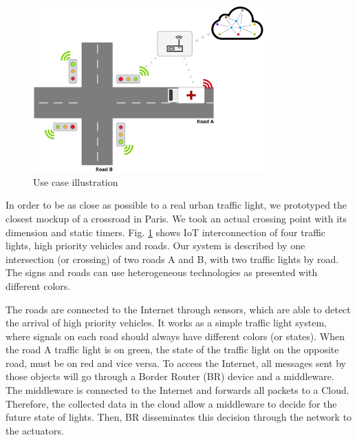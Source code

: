 \documentclass[conference]{../../setup/IEEEtran}
\begin{document}
\begin{figure}[!htb]
\centering
\includegraphics[width=3.5in]{res/CrossRoadModel_V1.eps}
\caption{Use case illustration}
\label{fig:CrossRoadModel.eps}
\end{figure}

In order to be as close as possible to a real urban traffic light, we prototyped the closest mockup of a crossroad in Paris. We took an actual crossing point with its dimension and static timers. Fig. \ref{fig:CrossRoadModel.eps} shows IoT interconnection of four traffic lights, high priority vehicles and roads.  Our system is described by one intersection (or crossing) of two roads A and B, with two traffic lights by road. The signs and roads can use heterogeneous technologies as presented with different colors. 

The roads are connected to the Internet through sensors, which are able to detect the arrival of high priority vehicles. It works as a simple traffic light system, where signals on each road should always have different colors (or states). When the road A traffic light is on green, the state of the traffic light on the opposite road, must be on red and vice versa. To access the Internet, all messages sent by those objects will go through a Border Router (BR) device and a middleware. The middleware is connected to the Internet and forwards all packets to a Cloud. Therefore, the collected data in the cloud allow a middleware to decide for the future state of lights. Then,  BR disseminates this decision through the network to the actuators.   



%
\end{document}
